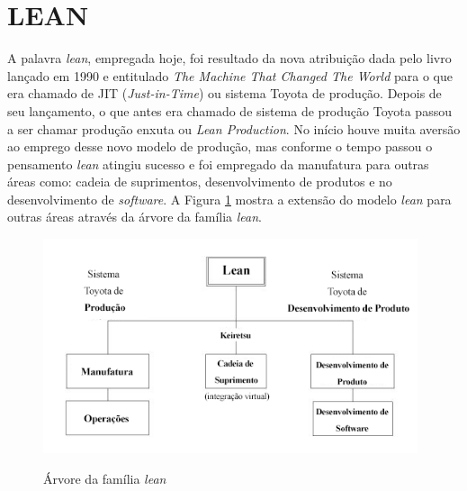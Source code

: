 \section{LEAN}

A palavra \textit{lean}, empregada hoje, foi resultado da nova atribuição dada pelo livro lançado em 1990 e entitulado \textit{The Machine That Changed The World} para o que era chamado de JIT (\textit{Just-in-Time}) ou sistema Toyota de produção. Depois de seu lançamento, o que antes era chamado de sistema de produção Toyota passou a ser chamar produção enxuta ou \textit{Lean Production}. No início houve muita aversão ao emprego desse novo modelo de produção, mas conforme o tempo passou o pensamento \textit{lean} atingiu sucesso e foi empregado da manufatura para outras  áreas como: cadeia de suprimentos, desenvolvimento de produtos e no desenvolvimento de \textit{software}. A Figura \ref{fig:lean_tree} mostra a extensão do modelo \textit{lean} para outras áreas através da árvore da família \textit{lean}.

\begin{figure}[htb!]
\begin{center}
\caption{Árvore da família \textit{lean}}
\label{fig:lean_tree}
\includegraphics[width=11cm]{assets/lean_tree} \\
\end{center}
\end{figure}


